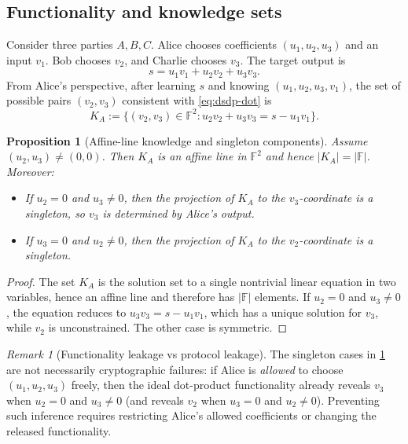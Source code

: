 \documentclass[11pt,a4paper]{article}
\newtheorem{proposition}[theorem]{Proposition}
\theoremstyle{definition}
\theoremstyle{remark}
\newtheorem{remark}[theorem]{Remark}
\newcommand{\F}{\mathbb{F}}
\begin{document}
\subsection{Functionality and knowledge sets}
Consider three parties \(A,B,C\). Alice chooses coefficients \((u_1,u_2,u_3)\) and an input \(v_1\). Bob chooses \(v_2\), and Charlie chooses \(v_3\). The target output is
\begin{equation}
\label{eq:dsdp-dot}
s = u_1 v_1 + u_2 v_2 + u_3 v_3.
\end{equation}
From Alice's perspective, after learning \(s\) and knowing \((u_1,u_2,u_3,v_1)\), the set of possible pairs \((v_2,v_3)\) consistent with \cref{eq:dsdp-dot} is
\begin{equation}
\label{eq:dsdp-knowledge-set}
K_A := \{(v_2,v_3)\in\F^2 : u_2 v_2 + u_3 v_3 = s - u_1 v_1\}.
\end{equation}

\begin{proposition}[Affine-line knowledge and singleton components]
\label{prop:dsdp-affine}
Assume \((u_2,u_3)\neq (0,0)\). Then \(K_A\) is an affine line in \(\F^2\) and hence \(|K_A|=|\F|\). Moreover:
\begin{itemize}[leftmargin=2em]
  \item If \(u_2=0\) and \(u_3\neq 0\), then the projection of \(K_A\) to the \(v_3\)-coordinate is a singleton, so \(v_3\) is determined by Alice's output.
  \item If \(u_3=0\) and \(u_2\neq 0\), then the projection of \(K_A\) to the \(v_2\)-coordinate is a singleton.
\end{itemize}
\end{proposition}

\begin{proof}
The set \(K_A\) is the solution set to a single nontrivial linear equation in two variables, hence an affine line and therefore has \(|\F|\) elements. If \(u_2=0\) and \(u_3\neq 0\), the equation reduces to \(u_3 v_3 = s-u_1 v_1\), which has a unique solution for \(v_3\), while \(v_2\) is unconstrained. The other case is symmetric.
\end{proof}

\begin{remark}[Functionality leakage vs protocol leakage]
The singleton cases in \cref{prop:dsdp-affine} are not necessarily cryptographic failures: if Alice is \emph{allowed} to choose \((u_1,u_2,u_3)\) freely, then the ideal dot-product functionality already reveals \(v_3\) when \(u_2=0\) and \(u_3\neq 0\) (and reveals \(v_2\) when \(u_3=0\) and \(u_2\neq 0\)). Preventing such inference requires restricting Alice's allowed coefficients or changing the released functionality.
\end{remark}
\end{document}
